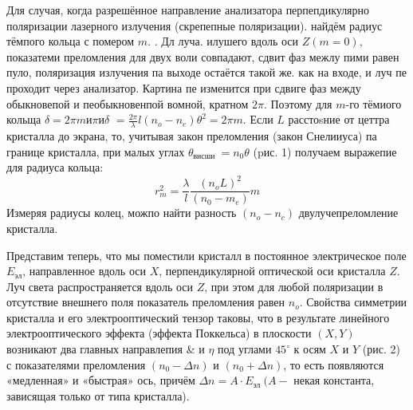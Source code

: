 \documentclass[a4paper, 12pt]{article}
\begin{document}
Для случая, когда разрешённое направление анализатора перпепдикулярно поляризации лазерного излучения (скрепепные поляризации). найдём радиус тёмпого кольца с помером $m$. . Дл луча. илушего вдоль оси $Z(m=0)$, показатеми преломления для двух воли совпадают, сдвит фаз межлу пими равен пуло, поляризация излучения па выходе остаётся такой же. как на входе, и луч пе проходит через анализатор. Картина пе изменится при сдвиге фаз между обыкновепой и пеобыкновенпой вомной, кратном $2 \pi$. Поэтому для $m$-го тёмиого кольща $\delta=2 \pi m и \pi и \delta$ $=\frac{2 \pi}{\lambda} l\left(n_o-n_e\right) \theta^2=2 \pi m$. Если $L$ расстоsние от цеттра кристалла до экрана, то, учитывая закон преломления (закон Снелииуса) па границе кристалла, при малых углах $\theta_{\text {висши }}=n_0 \theta$ (pис. 1) получаем выражепие для радиуса кольца:
\begin{equation}
r_m^2=\frac{\lambda}{l} \frac{\left(n_o L\right)^2}{\left(n_0-m_e\right)} m
\end{equation}
Измеряя радиусы колец, можпо найти разность $\left(n_o-n_c\right)$ двулучепреломление кристалла.

Представим теперь, что мы поместили кристалл в постоянное электрическое поле $E_{э л}$, направленное вдоль оси $X$, перпендикулярной оптической оси кристалла $Z$. Луч света распространяется вдоль оси $Z$, при этом для любой поляризации в отсутствие внешнего поля показатель преломления равен $n_o$. Свойства симметрии кристалла и его электрооптический тензор таковы, что в результате линейного электрооптического эффекта (эффекта Поккельса) в плоскости $(X, Y)$ возникают два главных направлепия \& и $\eta$ под углами $45^{\circ}$ к осям $X$ и $Y$ (рис. 2) с показателями преломления $\left(n_0-\Delta n\right)$ и $\left(n_0+\Delta n\right)$, то есть появляются «медленная» и «быстрая» ось, причём $\Delta n=A \cdot E_{\text {эл }}(A-$ некая константа, зависящая только от типа кристалла).
\end{document}
